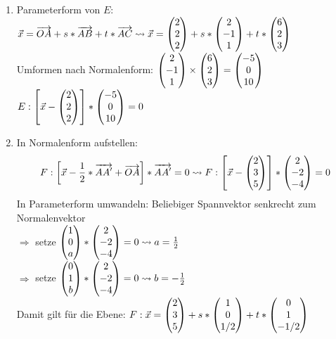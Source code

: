 \begin{lsg}{}
	\begin{enumerate}
		\item Parameterform von $E$: $\vec{x}=\overrightarrow{OA}+s*\overrightarrow{AB}+t*\overrightarrow{AC}\rightsquigarrow \vec{x}=\begin{pmatrix} 2\\2\\2 \end{pmatrix}+s*\begin{pmatrix} 2\\-1\\1 \end{pmatrix}+t*\begin{pmatrix} 6\\2\\3 \end{pmatrix}$\\
		Umformen nach Normalenform: $\begin{pmatrix} 2\\-1\\1 \end{pmatrix}\times \begin{pmatrix} 6\\2\\3 \end{pmatrix}=\begin{pmatrix} -5\\0\\10 \end{pmatrix}$\\
		$E:\left[\vec{x}-\begin{pmatrix} 2\\2\\2 \end{pmatrix}\right]*\begin{pmatrix} -5\\0\\10 \end{pmatrix}=0$
		\item In Normalenform aufstellen:
		\begin{equation*}
			F: \left[\vec x - \frac{1}{2}*\overrightarrow{AA'}+\overrightarrow{OA}\right]*\overrightarrow{AA'}=0\rightsquigarrow F: \left[\vec x - \begin{pmatrix} 2\\3\\5 \end{pmatrix}\right]*\begin{pmatrix} 2\\-2\\-4 \end{pmatrix}=0
		\end{equation*}
		In Parameterform umwandeln: Beliebiger Spannvektor senkrecht zum Normalenvektor\\ $\Rightarrow$ setze $\begin{pmatrix} 1\\0\\a \end{pmatrix}*\begin{pmatrix} 2\\-2\\-4 \end{pmatrix}=0 \rightsquigarrow a=\frac{1}{2}$\\
		$\Rightarrow$ setze $\begin{pmatrix} 0\\1\\b \end{pmatrix}*\begin{pmatrix} 2\\-2\\-4 \end{pmatrix}=0 \rightsquigarrow b=-\frac{1}{2}$\\
		Damit gilt für die Ebene: $F:\vec{x}=\begin{pmatrix} 2\\3\\5 \end{pmatrix}+s*\begin{pmatrix} 1\\0\\1/2 \end{pmatrix}+t*\begin{pmatrix} 0\\1\\-1/2 \end{pmatrix}$

\end{enumerate}
\end{lsg}

